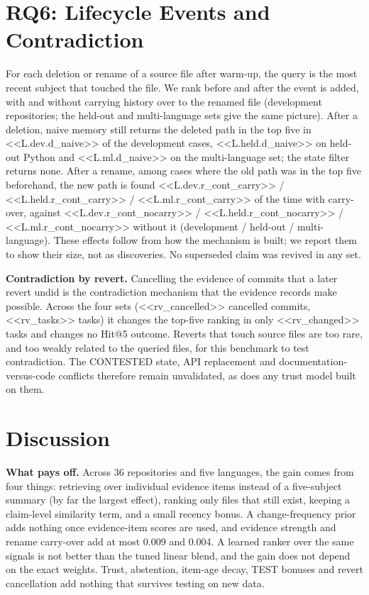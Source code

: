 \documentclass[conference]{IEEEtran}
\begin{document}
\section{RQ6: Lifecycle Events and Contradiction}
\label{sec:life}
For each deletion or rename of a source file after warm-up, the query is the most recent subject that touched the file. We rank before and after the event is added, with and without carrying history over to the renamed file (development repositories; the held-out and multi-language sets give the same picture). After a deletion, naive memory still returns the deleted path in the top five in <<L.dev.d_naive>> of the development cases, <<L.held.d_naive>> on held-out Python and <<L.ml.d_naive>> on the multi-language set; the state filter returns none. After a rename, among cases where the old path was in the top five beforehand, the new path is found <<L.dev.r_cont_carry>> / <<L.held.r_cont_carry>> / <<L.ml.r_cont_carry>> of the time with carry-over, against <<L.dev.r_cont_nocarry>> / <<L.held.r_cont_nocarry>> / <<L.ml.r_cont_nocarry>> without it (development / held-out / multi-language). These effects follow from how the mechanism is built; we report them to show their size, not as discoveries. No superseded claim was revived in any set.

\textbf{Contradiction by revert.} Cancelling the evidence of commits that a later revert undid is the contradiction mechanism that the evidence records make possible. Across the four sets (<<rv_cancelled>> cancelled commits, <<rv_tasks>> tasks) it changes the top-five ranking in only <<rv_changed>> tasks and changes no Hit@5 outcome. Reverts that touch source files are too rare, and too weakly related to the queried files, for this benchmark to test contradiction. The CONTESTED state, API replacement and documentation-versus-code conflicts therefore remain unvalidated, as does any trust model built on them.

\section{Discussion}
\textbf{What pays off.} Across 36 repositories and five languages, the gain comes from four things: retrieving over individual evidence items instead of a five-subject summary (by far the largest effect), ranking only files that still exist, keeping a claim-level similarity term, and a small recency bonus. A change-frequency prior adds nothing once evidence-item scores are used, and evidence strength and rename carry-over add at most 0.009 and 0.004. A learned ranker over the same signals is not better than the tuned linear blend, and the gain does not depend on the exact weights. Trust, abstention, item-age decay, TEST bonuses and revert cancellation add nothing that survives testing on new data.
\end{document}
